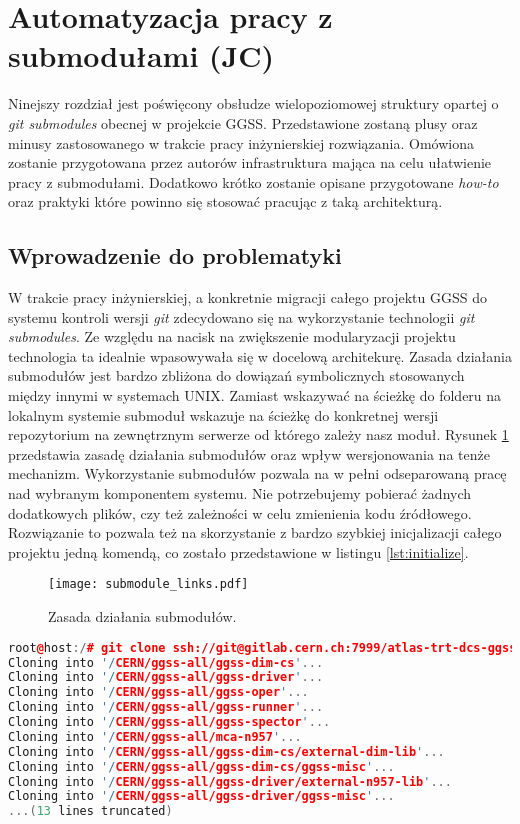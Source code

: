 \clearpage
\section{Automatyzacja pracy z submodułami (JC)}
\label{sec:gitio}

Ninejszy rozdział jest poświęcony obsłudze wielopoziomowej struktury opartej o \emph{git submodules} obecnej w projekcie GGSS. Przedstawione zostaną plusy oraz minusy zastosowanego w trakcie pracy inżynierskiej rozwiązania. Omówiona zostanie przygotowana przez autorów infrastruktura mająca na celu ułatwienie pracy z submodułami. Dodatkowo krótko zostanie opisane przygotowane \emph{how-to} oraz praktyki które powinno się stosować pracując z taką architekturą.

\subsection{Wprowadzenie do problematyki}

W trakcie pracy inżynierskiej, a konkretnie migracji całego projektu GGSS do systemu kontroli wersji \emph{git} zdecydowano się na wykorzystanie technologii \emph{git submodules}. Ze względu na nacisk na zwiększenie modularyzacji projektu technologia ta idealnie wpasowywała się w docelową architekurę. Zasada działania submodułów jest bardzo zbliżona do dowiązań symbolicznych stosowanych między innymi w systemach UNIX. Zamiast wskazywać na ścieżkę do folderu na lokalnym systemie submoduł wskazuje na ścieżkę do konkretnej wersji repozytorium na zewnętrznym serwerze od którego zależy nasz moduł. Rysunek \ref{fig:submodules_links} przedstawia zasadę działania submodułów oraz wpływ wersjonowania na tenże mechanizm. Wykorzystanie submodułów pozwala na w pełni odseparowaną pracę nad wybranym komponentem systemu. Nie potrzebujemy pobierać żadnych dodatkowych plików, czy też zależności w celu zmienienia kodu źródłowego. Rozwiązanie to pozwala też na skorzystanie z bardzo szybkiej inicjalizacji całego projektu jedną komendą, co zostało przedstawione w listingu \ref{lst:initialize}.

\begin{figure}[H]
    \centering
    \texttt{[image: submodule\_links.pdf]}
    \caption{Zasada działania submodułów.}
    \label{fig:submodules_links}
\end{figure}

\begin{lstlisting}[language=c++, caption={Inicjalizacja pełnej sturktury projektu jedną komendą.}, label={lst:initialize}]
root@host:/# git clone ssh://git@gitlab.cern.ch:7999/atlas-trt-dcs-ggss/ggss-all.git && cd ggss-all && git submodule update --init --recursive
Cloning into '/CERN/ggss-all/ggss-dim-cs'...
Cloning into '/CERN/ggss-all/ggss-driver'...
Cloning into '/CERN/ggss-all/ggss-oper'...
Cloning into '/CERN/ggss-all/ggss-runner'...
Cloning into '/CERN/ggss-all/ggss-spector'...
Cloning into '/CERN/ggss-all/mca-n957'...
Cloning into '/CERN/ggss-all/ggss-dim-cs/external-dim-lib'...
Cloning into '/CERN/ggss-all/ggss-dim-cs/ggss-misc'...
Cloning into '/CERN/ggss-all/ggss-driver/external-n957-lib'...
Cloning into '/CERN/ggss-all/ggss-driver/ggss-misc'...
...(13 lines truncated)
\end{lstlisting}


